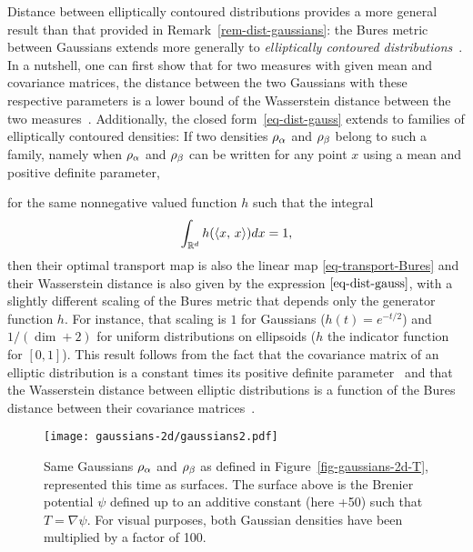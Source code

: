 \begin{rem2}{Distance between elliptically contoured distributions}\label{rem-dist-elliptic}
\citeauthor{gelbrich1990formula} provides a more general result than that provided in Remark~\ref{rem-dist-gaussians}: the Bures metric between Gaussians extends more generally to \emph{elliptically contoured distributions}~\citeyearpar{gelbrich1990formula}.
%
In a nutshell, one can first show that for two measures with given mean and covariance matrices, the distance between the two Gaussians with these respective parameters is a lower bound of the Wasserstein distance between the two measures~\citep[Theorem 2.1]{gelbrich1990formula}. Additionally, the closed form~\eqref{eq-dist-gauss} extends to families of elliptically contoured densities: If two densities $\rho_\alpha$ and $\rho_\beta$ belong to such a family, namely when $\rho_\alpha$ and $\rho_\beta$ can be written for any point $x$ using a mean and positive definite parameter,

for the same nonnegative valued function $h$ such that the integral $$\int_{\mathbb{R}^d} h(\langle x,\,x\rangle)dx=1,$$ then their optimal transport map is also the linear map \eqref{eq-transport-Bures} and their Wasserstein distance is also given by the expression $\eqref{eq-dist-gauss}$, with a slightly different scaling of the Bures metric that depends only the generator function $h$. For instance, that scaling is $1$ for Gaussians ($h(t)=e^{-t/2}$) and $1/(\dim+2)$ for uniform distributions on ellipsoids ($h$ the indicator function for $[0,1]$). This result follows from the fact that the covariance matrix of an elliptic distribution is a constant times its positive definite parameter~\citep[Theo. 4(ii)]{gomez2003survey} and that the Wasserstein distance between elliptic distributions is a function of the Bures distance between their covariance matrices~\citep[Cor. 2.5]{gelbrich1990formula}.
\end{rem2}
\begin{figure}[h!]
\centering
\texttt{[image: gaussians-2d/gaussians2.pdf]}
\caption{\protect\label{fig-gaussians-2d-psi} Same Gaussians $\rho_\alpha$ and $\rho_\beta$ as defined in Figure~\ref{fig-gaussians-2d-T}, represented this time as surfaces. The surface above is the Brenier potential $\psi$ defined up to an additive constant (here +50) such that $T=\nabla \psi$. For visual purposes, both Gaussian densities have been multiplied by a factor of 100.}
\end{figure}

